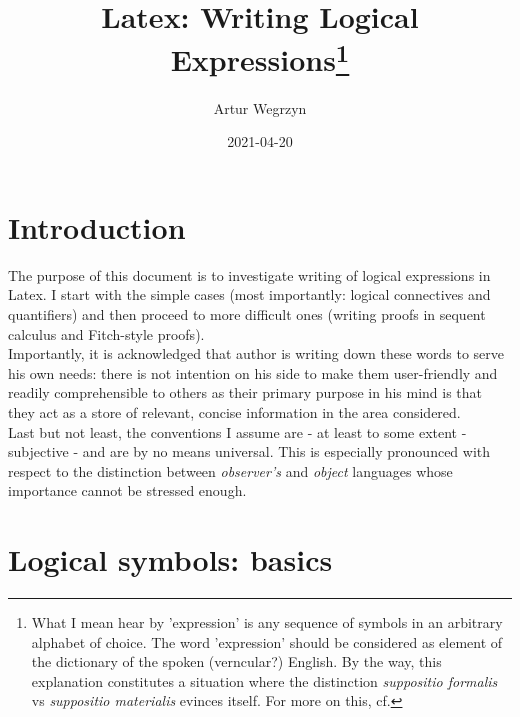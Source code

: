 \documentclass[12pt]{article}
\begin{document}
\title{Latex: Writing Logical Expressions\footnote{What I mean hear by 'expression' is any sequence of symbols in an arbitrary alphabet of choice. The word 'expression' should be considered as element of the dictionary of the spoken (verncular?) English. By the way, this explanation constitutes a situation where the distinction \textit{suppositio formalis} vs \textit{suppositio materialis} evinces itself. For more on this, cf. }}
\author{Artur Wegrzyn}
\date{2021-04-20}
\maketitle
\tableofcontents

\section{Introduction}
The purpose of this document is to investigate writing of logical expressions in Latex. I start with the simple cases (most importantly: logical connectives and quantifiers) and then proceed to more difficult ones (writing proofs in sequent calculus and Fitch-style proofs).
\\  \indent Importantly, it is acknowledged that author is writing down these words to serve his own needs: there is not intention on his side to make them user-friendly and readily comprehensible to others as their primary purpose in his mind is that they act as a store of relevant, concise information in the area considered.
\\ \indent Last but not least, the conventions I assume are - at least to some extent - subjective - and are by no means universal. This is especially pronounced with respect to the distinction between \textit{observer's} and \textit{object} languages whose importance cannot be stressed enough.
\section{Logical symbols: basics}
\end{document}

